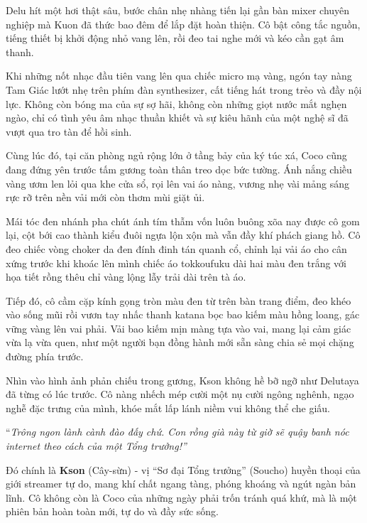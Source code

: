 ﻿\documentclass[../main.tex]{subfiles}
\begin{document}
\chrint

Delu hít một hơi thật sâu, bước chân nhẹ nhàng tiến lại gần bàn mixer chuyên nghiệp mà Kuon đã thức bao đêm để lắp đặt hoàn thiện. Cô bật công tắc nguồn, tiếng thiết bị khởi động nhỏ vang lên, rồi đeo tai nghe mới và kéo cần gạt âm thanh.

Khi những nốt nhạc đầu tiên vang lên qua chiếc micro mạ vàng, ngón tay nàng Tam Giác lướt nhẹ trên phím đàn synthesizer, cất tiếng hát trong trẻo và đầy nội lực. Không còn bóng ma của sự sợ hãi, không còn những giọt nước mắt nghẹn ngào, chỉ có tình yêu âm nhạc thuần khiết và sự kiêu hãnh của một nghệ sĩ đã vượt qua tro tàn để hồi sinh.

\ct

Cùng lúc đó, tại căn phòng ngủ rộng lớn ở tầng bảy của ký túc xá, Coco cũng đang đứng yên trước tấm gương toàn thân treo dọc bức tường. Ánh nắng chiều vàng ươm len lỏi qua khe cửa sổ, rọi lên vai áo nàng, vương nhẹ vài mảng sáng rực rỡ trên nền vải mới còn thơm mùi giặt ủi.

Mái tóc đen nhánh pha chút ánh tím thẫm vốn luôn buông xõa nay được cô gom lại, cột bới cao thành kiểu đuôi ngựa lộn xộn mà vẫn đầy khí phách giang hồ. Cô đeo chiếc vòng choker da đen đính đinh tán quanh cổ, chỉnh lại vải áo cho cân xứng trước khi khoác lên mình chiếc áo tokkoufuku dài hai màu đen trắng với họa tiết rồng thêu chỉ vàng lộng lẫy trải dài trên tà áo.

Tiếp đó, cô cầm cặp kính gọng tròn màu đen từ trên bàn trang điểm, đeo khéo vào sống mũi rồi vươn tay nhấc thanh katana bọc bao kiếm màu hồng loang, gác vững vàng lên vai phải. Vải bao kiếm mịn màng tựa vào vai, mang lại cảm giác vừa lạ vừa quen, như một người bạn đồng hành mới sẵn sàng chia sẻ mọi chặng đường phía trước.

Nhìn vào hình ảnh phản chiếu trong gương, Kson không hề bỡ ngỡ như Delutaya đã từng có lúc trước. Cô nàng nhếch mép cười một nụ cười ngông nghênh, ngạo nghễ đặc trưng của mình, khóe mắt lấp lánh niềm vui không thể che giấu.

``\textit{Trông ngon lành cành đào đấy chứ. Con rồng già này từ giờ sẽ quậy banh nóc internet theo cách của một Tổng trưởng!''}

\chrint

Đó chính là \textbf{Kson} (Cây-sừn) - vị ``Sơ đại Tổng trưởng'' (Soucho) huyền thoại của giới streamer tự do, mang khí chất ngang tàng, phóng khoáng và ngút ngàn bản lĩnh. Cô không còn là Coco của những ngày phải trốn tránh quá khứ, mà là một phiên bản hoàn toàn mới, tự do và đầy sức sống.
\end{document}
